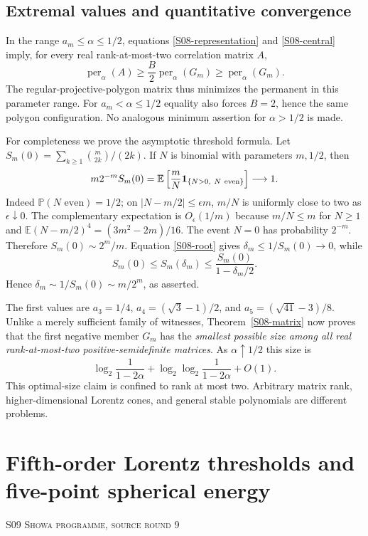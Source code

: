 \documentclass[11pt,a4paper]{article}
\theoremstyle{definition}\newtheorem{definition}[theorem]{Definition}
\theoremstyle{remark}\newtheorem{remark}[theorem]{Remark}
\numberwithin{equation}{section}
\begin{document}
\subsection{Extremal values and quantitative convergence}\label{S08-sec-5}
In the range $a_m\le\alpha\le1/2$, equations \eqref{S08-representation} and \eqref{S08-central} imply, for every real rank-at-most-two correlation matrix $A$,
\[
 \operatorname{per}_\alpha(A)\ge\frac B2\operatorname{per}_\alpha(G_m)
 \ge\operatorname{per}_\alpha(G_m).
\]
The regular-projective-polygon matrix thus minimizes the permanent in this parameter range. For $a_m<\alpha\le1/2$ equality also forces $B=2$, hence the same polygon configuration. No analogous minimum assertion for $\alpha>1/2$ is made.

For completeness we prove the asymptotic threshold formula. Let
$S_m(0)=\sum_{k\ge1}\binom m{2k}/(2k)$. If $N$ is binomial with parameters $m,1/2$, then
\[
 m2^{-m}S_m(0)=\mathbb E\left[\frac mN\mathbf1_{\{N>0,\ N\ {\rm even}\}}\right]\longrightarrow1.
\]
Indeed $\mathbb P(N\text{ even})=1/2$; on $|N-m/2|\le\epsilon m$, $m/N$ is uniformly close to two as $\epsilon\downarrow0$. The complementary expectation is $O_\epsilon(1/m)$ because $m/N\le m$ for $N\ge1$ and $\mathbb E(N-m/2)^4=(3m^2-2m)/16$. The event $N=0$ has probability $2^{-m}$. Therefore $S_m(0)\sim2^m/m$.
Equation \eqref{S08-root} gives $\delta_m\le1/S_m(0)\to0$, while
\[
 S_m(0)\le S_m(\delta_m)\le\frac{S_m(0)}{1-\delta_m/2}.
\]
Hence $\delta_m\sim1/S_m(0)\sim m/2^m$, as asserted.

The first values are $a_3=1/4$, $a_4=(\sqrt3-1)/2$, and $a_5=(\sqrt{41}-3)/8$. Unlike a merely sufficient family of witnesses, Theorem~\ref{S08-matrix} now proves that the first negative member $G_m$ has the \emph{smallest possible size among all real rank-at-most-two positive-semidefinite matrices}. As $\alpha\uparrow1/2$ this size is
\[
 \log_2\frac1{1-2\alpha}+\log_2\log_2\frac1{1-2\alpha}+O(1).
\]
This optimal-size claim is confined to rank at most two. Arbitrary matrix rank, higher-dimensional Lorentz cones, and general stable polynomials are different problems.




\clearpage
\section[S09 --- Fifth-order Lorentz thresholds and five-point spherical energy]{Fifth-order Lorentz thresholds and five-point spherical energy}\label{contrib-S09}
\noindent\textsc{S09 \quad Showa programme, source round 9}\par\medskip
\end{document}
